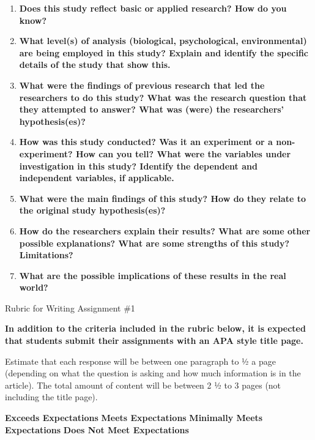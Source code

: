 \documentclass[
]{book}
\providecommand{\tightlist}{%
  \setlength{\itemsep}{0pt}\setlength{\parskip}{0pt}}
\begin{document}
\begin{assessment}
\begin{enumerate}
\def\labelenumi{\arabic{enumi}.}
\tightlist
\item
  \textbf{Does this study reflect basic or applied research? How do you know?}\\
\item
  \textbf{What level(s) of analysis (biological, psychological, environmental) are being employed in this study? Explain and identify the specific details of the study that show this.}\\
\item
  \textbf{What were the findings of previous research that led the researchers to do this study? What was the research question that they attempted to answer? What was (were) the researchers' hypothesis(es)?}\\
\item
  \textbf{How was this study conducted? Was it an experiment or a non-experiment? How can you tell? What were the variables under investigation in this study? Identify the dependent and independent variables, if applicable.}\\
\item
  \textbf{What were the main findings of this study? How do they relate to the original study hypothesis(es)?}\\
\item
  \textbf{How do the researchers explain their results? What are some other possible explanations? What are some strengths of this study? Limitations?}\\
\item
  \textbf{What are the possible implications of these results in the real world?}
\end{enumerate}

{Rubric for Writing Assignment \#1}

\textbf{In addition to the criteria included in the rubric below, it is expected that students submit their assignments with an APA style title page.}

Estimate that each response will be between one paragraph to ½ a page (depending on what the question is asking and how much information is in the article). The total amount of content will be between 2 ½ to 3 pages (not including the title page).

\textbf{Exceeds Expectations} \textbar{} \textbf{Meets Expectations} \textbar{} \textbf{Minimally Meets Expectations} \textbar{} \textbf{Does Not Meet Expectations} \textbar{}


\end{assessment}
\end{document}
